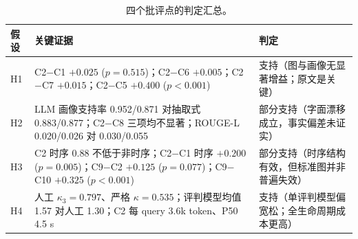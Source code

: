 \begin{table}[H]
\centering
\caption{四个批评点的判定汇总。}
\label{tab:verdict}
\small
\begin{tabular}{@{}p{}p{}p{}@{}}
\toprule
假设 & 关键证据 & 判定\\
\midrule
H1 & C2$-$C1 $+0.025$ ($p=0.515$)；C2$-$C6 $+0.005$；C2$-$C7 $+0.015$；C2$-$C5 $+0.400$ ($p<0.001$) & 支持（图与画像无显著增益；原文是关键）\\
H2 & LLM 画像支持率 0.952/0.871 对抽取式 0.883/0.877；C2$-$C8 三项均不显著；ROUGE-L 0.020/0.026 对 0.030/0.055 & 部分支持（字面漂移成立，事实偏差未证实）\\
H3 & C2 时序 0.88 不低于非时序；C2$-$C1 时序 $+0.200$ ($p=0.005$)；C9$-$C2 $+0.125$ ($p=0.077$)；C9$-$C10 $+0.325$ ($p<0.001$) & 部分支持（时序结构有效，但标准图并非普遍失效）\\
H4 & 人工 $\kappa_3=0.797$、严格 $\kappa=0.535$；评判模型均值 1.57 对人工 1.30；C2 每 query 3.6k token、P50 4.5 s & 支持（单评判模型偏宽松；全生命周期成本更高）\\
\bottomrule
\end{tabular}
\end{table}